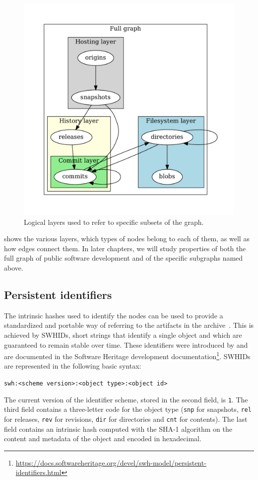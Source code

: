 \begin{figure}
    \centering
    \includegraphics[width=0.6\linewidth,trim=1cm 1cm 1cm 1cm]{img/swh-layers}
    \caption{Logical layers used to refer to specific subsets of the graph.}%
    \label{fig:layers}
\end{figure}
 shows the various layers, which types of nodes belong to
each of them, as well as how edges connect them. In later chapters, we will
study properties of both the full graph of public software development and of
the specific subgraphs named above.


\subsection{Persistent identifiers}%
\label{sec:swhid}

The intrinsic hashes used to identify the nodes can be used to provide a
standardized and portable way of referring to the artifacts in the
archive~\cite{swhipres2018}. This is achieved by \glspl{SWHID},
short strings that identify a single object and which are guaranteed to remain
stable over time.  These identifiers were introduced by
\textcite{cise-2020-doi} and are documented in the Software Heritage
development
documentation\footnote{\url{https://docs.softwareheritage.org/devel/swh-model/persistent-identifiers.html}}.
\glspl{SWHID} are represented in the following basic syntax:

\texttt{swh:<scheme version>:<object type>:<object id>}

The current version of the identifier scheme, stored in the second field, is
\texttt{1}. The third field contains a three-letter code for the object type
(\texttt{snp} for snapshots, \texttt{rel} for releases, \texttt{rev} for
revisions, \texttt{dir} for directories and \texttt{cnt} for contents). The
last field contains an intrinsic hash computed with the SHA-1 algorithm on the
content and metadata of the object and encoded in hexadecimal.

